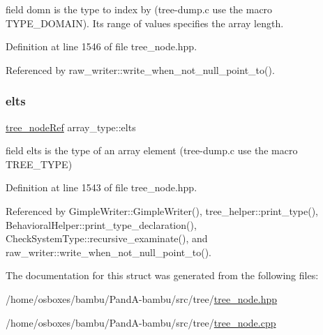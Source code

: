 field domn is the type to index by (tree-\/dump.\+c use the macro T\+Y\+P\+E\+\_\+\+D\+O\+M\+A\+IN). Its range of values specifies the array length. 



Definition at line 1546 of file tree\+\_\+node.\+hpp.



Referenced by raw\+\_\+writer\+::write\+\_\+when\+\_\+not\+\_\+null\+\_\+point\+\_\+to().

\mbox{\label{structarray__type_aa7c3522339065eccaa347128ff7fe5b1}} 
\subsubsection{\texorpdfstring{elts}{elts}}
{\footnotesize\ttfamily \hyperlink{tree__node_8hpp_a6ee377554d1c4871ad66a337eaa67fd5}{tree\+\_\+node\+Ref} array\+\_\+type\+::elts}



field elts is the type of an array element (tree-\/dump.\+c use the macro T\+R\+E\+E\+\_\+\+T\+Y\+PE) 



Definition at line 1543 of file tree\+\_\+node.\+hpp.



Referenced by Gimple\+Writer\+::\+Gimple\+Writer(), tree\+\_\+helper\+::print\+\_\+type(), Behavioral\+Helper\+::print\+\_\+type\+\_\+declaration(), Check\+System\+Type\+::recursive\+\_\+examinate(), and raw\+\_\+writer\+::write\+\_\+when\+\_\+not\+\_\+null\+\_\+point\+\_\+to().



The documentation for this struct was generated from the following files\+:\begin{DoxyCompactItemize}
\item 
/home/osboxes/bambu/\+Pand\+A-\/bambu/src/tree/\hyperlink{tree__node_8hpp}{tree\+\_\+node.\+hpp}\item 
/home/osboxes/bambu/\+Pand\+A-\/bambu/src/tree/\hyperlink{tree__node_8cpp}{tree\+\_\+node.\+cpp}\end{DoxyCompactItemize}
